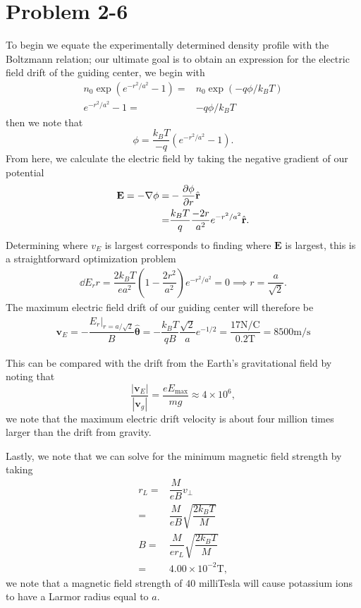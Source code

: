\section*{Problem 2-6}
\label{sec:2-6}
To begin we equate the experimentally determined density profile with the Boltzmann relation; our ultimate goal is to obtain an expression for the electric field drift of the guiding center, we begin with
\begin{align}
	n_0\exp(e^{-r^2/a^2} - 1) =& n_0\exp(-q\phi/k_BT)\\
	e^{-r^2/a^2} - 1 =& -q\phi/k_BT
\end{align}
then we note that
\begin{equation}
	\phi = \dfrac{k_BT}{-q}\left(e^{-r^2/a^2}-1\right).
\end{equation}
From here, we calculate the electric field by taking the negative gradient of our potential
\begin{align}
	\textbf{E} = -\nabla \phi =& -\frac{\partial \phi}{\partial r}\hat{\textbf{r}} \\
	=& \dfrac{k_BT}{q} \dfrac{-2r}{a^2} e^{-r^2/a^2} \hat{\textbf{r}}.
\end{align}
Determining where \(v_E\) is largest corresponds to finding where \(\textbf{E}\) is largest, this is a straightforward optimization problem
\begin{align}
	\dd{E_r}{r} = \dfrac{2k_BT}{ea^2}\left(1 - \dfrac{2r^2}{a^2} \right)e^{-r^2/a^2} = 0 \implies r = \dfrac{a}{\sqrt{2}}.
\end{align}
The maximum electric field drift of our guiding center will therefore be
\begin{align}
	\textbf{v}_E = -\dfrac{E_r|_{r = a/\sqrt{2}}}{B} \hat{\bm{\theta}} = -\dfrac{k_BT}{qB}\dfrac{\sqrt{2}}{a}e^{-1/2} = \dfrac{17\text{N}/\text{C}}{0.2\text{T}} = 8500\text{m/s}
\end{align}

This can be compared with the drift from the Earth's gravitational field by noting that 
\begin{equation}
	\dfrac{|\textbf{v}_E|}{|\textbf{v}_g|} = \dfrac{eE_\text{max}}{mg} \approx 4\times 10^6,
\end{equation}
we note that the maximum electric drift velocity is about four million times larger than the drift from gravity.

Lastly, we note that we can solve for the minimum magnetic field strength by taking
\begin{align}
	r_L =& \dfrac{M}{eB} v_\perp \\
		=& \dfrac{M}{eB} \sqrt{\dfrac{2k_BT}{M}} \\
	B	=& \dfrac{M}{er_L} \sqrt{\dfrac{2k_BT}{M}} \\
	=& 4.00 \times 10^{-2}\text{T},
\end{align}
we note that a magnetic field strength of \(40\) milliTesla will cause potassium ions to have a Larmor radius equal to \(a\).

